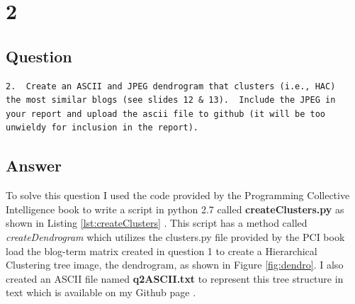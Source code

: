 \documentclass[letterpaper,11pt]{article}
\newcommand*{\srcPath}{../src}%
\begin{document}
 

 

 


\clearpage


\section*{2}

\subsection*{Question}

\begin{verbatim}
2.  Create an ASCII and JPEG dendrogram that clusters (i.e., HAC)
the most similar blogs (see slides 12 & 13).  Include the JPEG in
your report and upload the ascii file to github (it will be too
unwieldy for inclusion in the report).
\end{verbatim}

\subsection*{Answer}

To solve this question I used the code provided by the Programming Collective Intelligence book to write a script in python 2.7 called \textbf{createClusters.py} as shown in Listing \ref{lst:createClusters} \cite{collectiveIntell}. This script has a method called \textit{createDendrogram} which utilizes the clusters.py file provided by the PCI book load the blog-term matrix created in question 1 to create a Hierarchical Clustering tree image, the dendrogram, as shown in Figure \ref{fig:dendro}. I also created an ASCII file named \textbf{q2ASCII.txt} to represent this tree structure in text which is available on my Github page \cite{github}.
\end{document}
